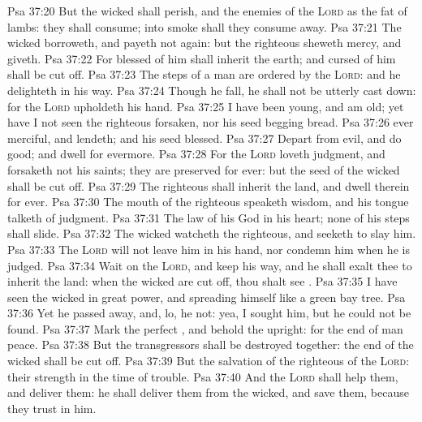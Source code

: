 \vs Psa 37:20 But the wicked shall perish, and the enemies of the \textsc{Lord}  as the fat of lambs: they shall consume; into smoke shall they consume away.
\vs Psa 37:21 The wicked borroweth, and payeth not again: but the righteous sheweth mercy, and giveth.
\vs Psa 37:22 For  blessed of him shall inherit the earth; and  cursed of him shall be cut off.
\vs Psa 37:23 The steps of a  man are ordered by the \textsc{Lord}: and he delighteth in his way.
\vs Psa 37:24 Though he fall, he shall not be utterly cast down: for the \textsc{Lord} upholdeth  his hand.
\vs Psa 37:25 I have been young, and  am old; yet have I not seen the righteous forsaken, nor his seed begging bread.
\vs Psa 37:26  ever merciful, and lendeth; and his seed  blessed.
\vs Psa 37:27 Depart from evil, and do good; and dwell for evermore.
\vs Psa 37:28 For the \textsc{Lord} loveth judgment, and forsaketh not his saints; they are preserved for ever: but the seed of the wicked shall be cut off.
\vs Psa 37:29 The righteous shall inherit the land, and dwell therein for ever.
\vs Psa 37:30 The mouth of the righteous speaketh wisdom, and his tongue talketh of judgment.
\vs Psa 37:31 The law of his God  in his heart; none of his steps shall slide.
\vs Psa 37:32 The wicked watcheth the righteous, and seeketh to slay him.
\vs Psa 37:33 The \textsc{Lord} will not leave him in his hand, nor condemn him when he is judged.
\vs Psa 37:34 Wait on the \textsc{Lord}, and keep his way, and he shall exalt thee to inherit the land: when the wicked are cut off, thou shalt see .
\vs Psa 37:35 I have seen the wicked in great power, and spreading himself like a green bay tree.
\vs Psa 37:36 Yet he passed away, and, lo, he  not: yea, I sought him, but he could not be found.
\vs Psa 37:37 Mark the perfect , and behold the upright: for the end of  man  peace.
\vs Psa 37:38 But the transgressors shall be destroyed together: the end of the wicked shall be cut off.
\vs Psa 37:39 But the salvation of the righteous  of the \textsc{Lord}:  their strength in the time of trouble.
\vs Psa 37:40 And the \textsc{Lord} shall help them, and deliver them: he shall deliver them from the wicked, and save them, because they trust in him.
